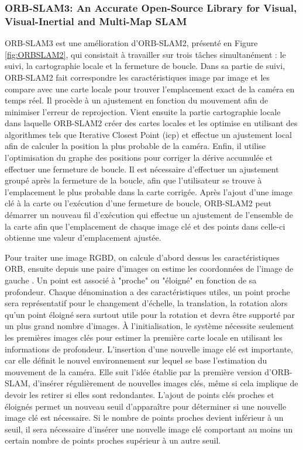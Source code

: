 \documentclass[11pt]{article}
\begin{document}
        \subsubsection{ORB-SLAM3: An Accurate Open-Source Library for Visual, Visual-Inertial and Multi-Map SLAM}
          ORB-SLAM3 \cite{camposORBSLAM3AccurateOpenSource2021} est une amélioration d'ORB-SLAM2, présenté 
          en Figure \ref{fig:ORBSLAM2}, qui consistait à travailler sur trois tâches simultanément : 
          le suivi, la cartographie locale et la fermeture de boucle. Dans sa partie de suivi, ORB-SLAM2 fait correspondre les caractéristiques image 
          par image et les compare avec une carte locale pour trouver l'emplacement exact de la caméra en temps réel. Il procède à un ajustement 
          en fonction du mouvement afin de minimiser l'erreur de reprojection. Vient ensuite la partie cartographie locale 
          dans laquelle ORB-SLAM2 
          créer des cartes locales et les optimise en utilisant des algorithmes tels que Iterative Closest Point (\acrshort{icp}) et effectue un ajustement 
          local afin de calculer la position la plus probable de la caméra. Enfin, il utilise l'optimisation du graphe des positions 
          pour corriger la dérive accumulée et effectuer une fermeture de boucle. Il est nécessaire d'effectuer un ajustement groupé
          après la fermeture de la boucle, afin que l'utilisateur se trouve à l'emplacement le plus probable dans la carte corrigée. 
          Après l'ajout d'une image clé à la carte ou l'exécution d'une fermeture de boucle, 
          ORB-SLAM2 peut démarrer un nouveau fil d'exécution qui effectue un ajustement de l'ensemble de la carte afin que 
          l'emplacement de chaque image clé et des points dans celle-ci obtienne une valeur d'emplacement ajustée.

          Pour traiter une image RGBD, on calcule d'abord dessus les caractéristiques ORB, ensuite depuis une paire d’images on estime les coordonnées de l'image de 
          gauche . Un point est associé à "proche" ou "éloigné" en fonction de sa profondeur. Chaque dénomination a des
          caractéristiques utiles, un point proche sera représentatif pour le changement d'échelle, la translation, la rotation alors qu'un point éloigné
          sera surtout utile pour la rotation et devra être supporté par un plus grand nombre d'images.
          À l'initialisation, le système nécessite seulement les premières images clés pour estimer la première carte locale en utilisant les informations
          de profondeur. 
          L'insertion d'une nouvelle image clé est importante, car elle définit le nouvel environnement sur lequel se base l'estimation du mouvement 
          de la caméra. Elle suit l'idée établie par la première version d'ORB-SLAM, d'insérer régulièrement de nouvelles images clés, 
          même si cela implique de devoir les retirer si elles sont redondantes. L'ajout de points clés proches et éloignés permet un nouveau seuil 
          d'apparaître pour déterminer si une nouvelle image clé est nécessaire. 
          Si le nombre de points proches devient inférieur à un seuil, il sera nécessaire d'insérer une nouvelle image clé comportant au moins un certain
          nombre de points proches supérieur à un autre seuil.
\end{document}
